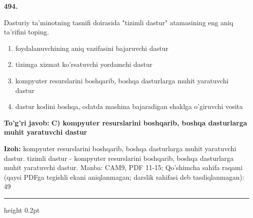 \documentclass[10pt,a4paper]{article}
\begin{document}
{\bfseries\sffamily\color{ink} 494.}
\par
Dasturiy ta'minotning tasnifi doirasida "tizimli dastur" atamasining eng aniq ta'rifini toping.
\begin{enumerate}[label=\Alph*),leftmargin=9mm]
\item foydalanuvchining aniq vazifasini bajaruvchi dastur
\item tizimga xizmat ko'rsatuvchi yordamchi dastur
\item kompyuter resurslarini boshqarib, boshqa dasturlarga muhit yaratuvchi dastur
\item dastur kodini boshqa, odatda mashina bajaradigan shaklga o'giruvchi vosita
\end{enumerate}
\begin{tcolorbox}[enhanced,breakable,colback=teal!4,colframe=teal!60!black,boxrule=0.45pt,arc=1.2mm,left=2.7mm,right=2.7mm,top=1.8mm,bottom=1.8mm,before skip=2mm,after skip=2mm]
{\bfseries\sffamily\color{teal}To'g'ri javob:} \textbf{C) kompyuter resurslarini boshqarib, boshqa dasturlarga muhit yaratuvchi dastur}
\par\smallskip
{\bfseries Izoh:} kompyuter resurslarini boshqarib, boshqa dasturlarga muhit yaratuvchi dastur. tizimli dastur - kompyuter resurslarini boshqarib, boshqa dasturlarga muhit yaratuvchi dastur. Manba: CAM9, PDF 11-15; Qo'shimcha sahifa raqami (qaysi PDFga tegishli ekani aniqlanmagan; darslik sahifasi deb tasdiqlanmagan): 49
\end{tcolorbox}
\vspace{2mm}\hrule height 0.2pt\vspace{3mm}
\end{document}
